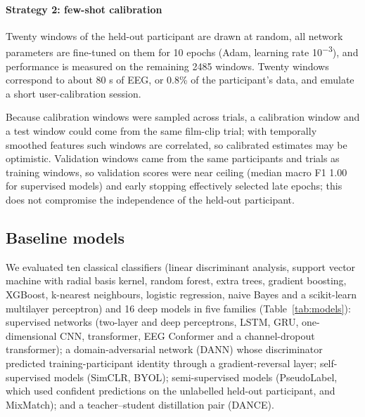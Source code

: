 \paragraph{Strategy 2: few-shot calibration}
Twenty windows of the held-out participant are drawn at random, all network parameters are fine-tuned on them for 10 epochs (Adam, learning rate 10\textsuperscript{−3}), and performance is measured on the remaining 2485 windows. Twenty windows correspond to about 80 s of EEG, or 0.8\% of the participant’s data, and emulate a short user-calibration session.

Because calibration windows were sampled across trials, a calibration window and a test window could come from the same film-clip trial; with temporally smoothed features such windows are correlated, so calibrated estimates may be optimistic\cite{liblock}. Validation windows came from the same participants and trials as training windows, so validation scores were near ceiling (median macro F1 1.00 for supervised models) and early stopping effectively selected late epochs; this does not compromise the independence of the held-out participant.


\subsection{Baseline models}
We evaluated ten classical classifiers (linear discriminant analysis, support vector machine with radial basis kernel, random forest, extra trees, gradient boosting, XGBoost\cite{xgboost}, k-nearest neighbours, logistic regression, naive Bayes and a scikit-learn multilayer perceptron) and 16 deep models in five families (Table~\ref{tab:models}): supervised networks (two-layer and deep perceptrons, LSTM, GRU, one-dimensional CNN, transformer\cite{vaswani}, EEG Conformer\cite{conformer} and a channel-dropout transformer); a domain-adversarial network (DANN)\cite{ganin} whose discriminator predicted training-participant identity through a gradient-reversal layer; self-supervised models (SimCLR\cite{simclr}, BYOL\cite{byol}); semi-supervised models (PseudoLabel\cite{pseudo}, which used confident predictions on the unlabelled held-out participant, and MixMatch\cite{mixmatch}); and a teacher–student distillation pair (DANCE)\cite{hinton}.

